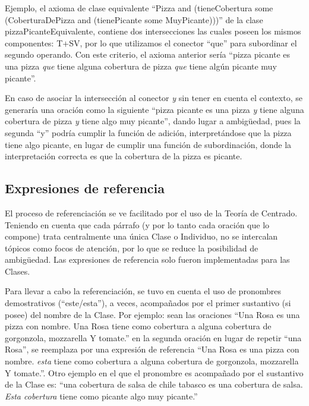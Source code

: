 Ejemplo, el axioma de clase equivalente ``Pizza and (tieneCobertura some (CoberturaDePizza and (tienePicante some MuyPicante)))'' de la clase pizzaPicanteEquivalente, contiene dos intersecciones las cuales poseen los mismos componentes: T$+$SV, por lo que utilizamos el conector ``que'' para subordinar el segundo operando. Con este criterio, el axioma anterior sería ``pizza picante es una pizza \emph{que} tiene alguna cobertura de pizza \emph{que} tiene algún picante muy picante''.

En caso de asociar la intersección al conector \emph{y} sin tener en cuenta el contexto, se generaría una oración como la siguiente ``pizza picante es una pizza \emph{y} tiene alguna cobertura de pizza \emph{y} tiene algo muy picante'', dando lugar a ambigüedad, pues la segunda ``y'' podría cumplir la función de adición, interpretándose que la pizza tiene algo picante, en lugar de cumplir una función de subordinación, donde la interpretación correcta es que la cobertura de la pizza es picante. 


\subsection{Expresiones de referencia}
El proceso de referenciación se ve facilitado por el uso de la Teoría de Centrado. 
Teniendo en cuenta que cada párrafo (y por lo tanto cada oración que lo compone) trata centralmente una única Clase o Individuo, no se intercalan tópicos como focos de atención, por lo que se reduce la posibilidad de ambigüedad. Las expresiones de referencia solo fueron implementadas para las Clases.

Para llevar a cabo la referenciación, se tuvo en cuenta el uso de pronombres demostrativos (``este/esta''), a veces, acompañados por el primer sustantivo (si posee) del nombre de la Clase. Por ejemplo: sean las oraciones ``Una Rosa es una pizza con nombre. Una Rosa tiene como cobertura a alguna cobertura de gorgonzola, mozzarella Y tomate.'' en la segunda oración en lugar de repetir ``una Rosa'', se reemplaza por una expresión de referencia ``Una Rosa es una pizza con nombre. \emph{esta} tiene como cobertura a alguna cobertura de gorgonzola, mozzarella Y tomate.''. Otro ejemplo en el que el pronombre es acompañado por el sustantivo de la Clase es: ``una cobertura de salsa de chile tabasco es una cobertura de salsa. \emph{Esta cobertura} tiene como picante algo muy picante.''

